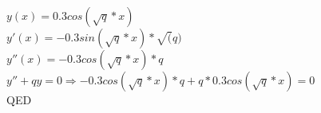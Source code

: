 $y(x)=0.3cos(\sqrt{q}*x)$ \\ 
$y'(x)=-0.3sin(\sqrt{q}*x)*\sqrt(q)$ \\ 
$y''(x)=-0.3cos(\sqrt{q}*x)*q$ \\
$y'' + qy = 0 \Rightarrow -0.3cos(\sqrt{q}*x)*q+q*0.3cos(\sqrt{q}*x) = 0$ \\
QED